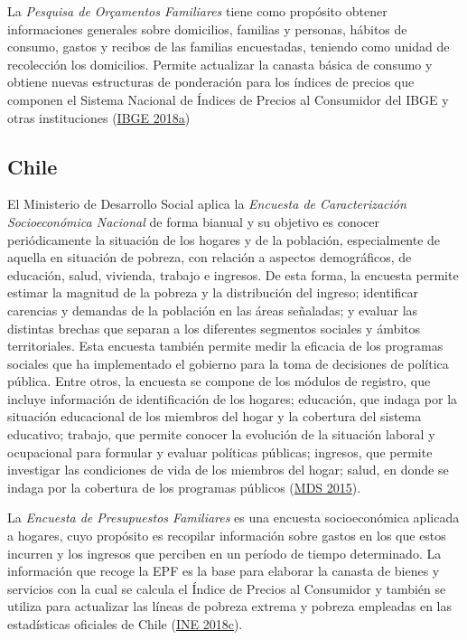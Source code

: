 \documentclass[
  12pt,
  spanish,
]{book}
\begin{document}
La \emph{Pesquisa de Orçamentos Familiares} tiene como propósito obtener informaciones generales sobre domicilios, familias y personas, hábitos de consumo, gastos y recibos de las familias encuestadas, teniendo como unidad de recolección los domicilios. Permite actualizar la canasta básica de consumo y obtiene nuevas estructuras de ponderación para los índices de precios que componen el Sistema Nacional de Índices de Precios al Consumidor del IBGE y otras instituciones (\protect\hyperlink{ref-IBGE-BR2018}{IBGE 2018a})

\hypertarget{chile}{%
\subsection*{Chile}\label{chile}}

El Ministerio de Desarrollo Social aplica la \emph{Encuesta de Caracterización Socioeconómica Nacional} de forma bianual y su objetivo es conocer periódicamente la situación de los hogares y de la población, especialmente de aquella en situación de pobreza, con relación a aspectos demográficos, de educación, salud, vivienda, trabajo e ingresos. De esta forma, la encuesta permite estimar la magnitud de la pobreza y la distribución del ingreso; identificar carencias y demandas de la población en las áreas señaladas; y evaluar las distintas brechas que separan a los diferentes segmentos sociales y ámbitos territoriales. Esta encuesta también permite medir la eficacia de los programas sociales que ha implementado el gobierno para la toma de decisiones de política pública. Entre otros, la encuesta se compone de los módulos de registro, que incluye información de identificación de los hogares; educación, que indaga por la situación educacional de los miembros del hogar y la cobertura del sistema educativo; trabajo, que permite conocer la evolución de la situación laboral y ocupacional para formular y evaluar políticas públicas; ingresos, que permite investigar las condiciones de vida de los miembros del hogar; salud, en donde se indaga por la cobertura de los programas públicos (\protect\hyperlink{ref-MDS-CL_2015}{MDS 2015}).

La \emph{Encuesta de Presupuestos Familiares} es una encuesta socioeconómica aplicada a hogares, cuyo propósito es recopilar información sobre gastos en los que estos incurren y los ingresos que perciben en un período de tiempo determinado. La información que recoge la EPF es la base para elaborar la canasta de bienes y servicios con la cual se calcula el Índice de Precios al Consumidor y también se utiliza para actualizar las líneas de pobreza extrema y pobreza empleadas en las estadísticas oficiales de Chile (\protect\hyperlink{ref-INE_CL}{INE 2018c}).
\end{document}
